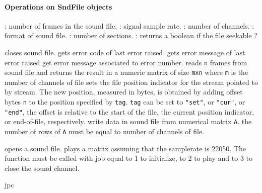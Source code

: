 \paragraph{Operations on SndFile objects}
\begin{itemize}
  : number of frames in the sound file. 
  : signal sample rate.
  : number of channels. 
  :  format of sound file. 
  : number of sections.
  : returns a boolean if the file seekable ? 
\end{itemize}
\begin{itemize}
   closes sound file. 
   gets error code of last error raised. 
   gets error message of last error raised
   get error message associated to error number.
    reads \verb+n+ frames from sound file and returns the 
  result in a numeric matrix of size \verb+mxn+ where \verb+m+ is the 
  number of channels of file
   sets the file position indicator for the stream pointed
       to by stream.  The new position, measured in bytes, is obtained  by  adding
       offset  bytes \verb+n+  to  the  position  specified by \verb+tag+. 
        \verb+tag+ can be set to \verb+"set"+, or \verb+"cur"+, or \verb+"end"+, 
	the offset is relative to the start of the
       file, the current position indicator, or end-of-file, respectively.
   write data in sound file from numerical matrix \verb+A+. 
  the number of rows of \verb+A+ must be equal to number of channels of file.
\end{itemize}

\begin{itemize}
   opens a sound file. 
     plays a matrix assuming that the samplerate is 22050.
    The function must be called with job equal to 1 to initialize, to 2 to play 
    and to 3 to close the sound channel.
\end{itemize}

\begin{examples}
  \begin{program}
  \end{program}
\end{examples}

\begin{manseealso}
\end{manseealso}

\begin{authors}
jpc 
\end{authors}

